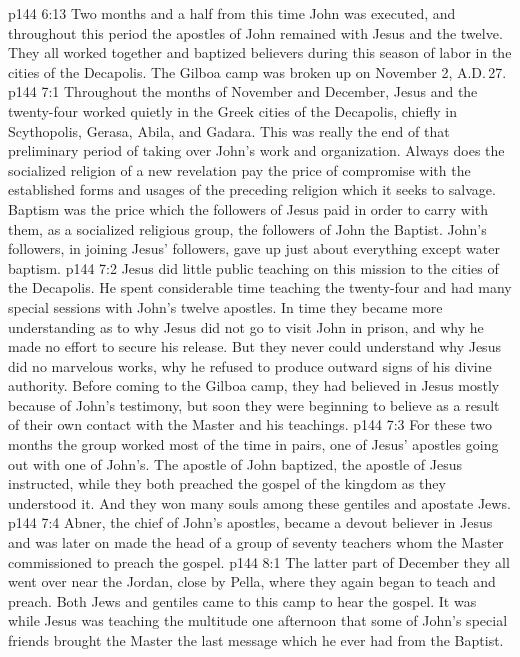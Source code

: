 \vs p144 6:13 \pc Two months and a half from this time John was executed, and throughout this period the apostles of John remained with Jesus and the twelve. They all worked together and baptized believers during this season of labor in the cities of the Decapolis. The Gilboa camp was broken up on November 2, A.D.\,27.
\vs p144 7:1 Throughout the months of November and December, Jesus and the twenty\hyp{}four worked quietly in the Greek cities of the Decapolis, chiefly in Scythopolis, Gerasa, Abila, and Gadara. This was really the end of that preliminary period of taking over John’s work and organization. Always does the socialized religion of a new revelation pay the price of compromise with the established forms and usages of the preceding religion which it seeks to salvage. Baptism was the price which the followers of Jesus paid in order to carry with them, as a socialized religious group, the followers of John the Baptist. John’s followers, in joining Jesus’ followers, gave up just about everything except water baptism.
\vs p144 7:2 Jesus did little public teaching on this mission to the cities of the Decapolis. He spent considerable time teaching the twenty\hyp{}four and had many special sessions with John’s twelve apostles. In time they became more understanding as to why Jesus did not go to visit John in prison, and why he made no effort to secure his release. But they never could understand why Jesus did no marvelous works, why he refused to produce outward signs of his divine authority. Before coming to the Gilboa camp, they had believed in Jesus mostly because of John’s testimony, but soon they were beginning to believe as a result of their own contact with the Master and his teachings.
\vs p144 7:3 For these two months the group worked most of the time in pairs, one of Jesus’ apostles going out with one of John’s. The apostle of John baptized, the apostle of Jesus instructed, while they both preached the gospel of the kingdom as they understood it. And they won many souls among these gentiles and apostate Jews.
\vs p144 7:4 Abner, the chief of John’s apostles, became a devout believer in Jesus and was later on made the head of a group of seventy teachers whom the Master commissioned to preach the gospel.
\vs p144 8:1 The latter part of December they all went over near the Jordan, close by Pella, where they again began to teach and preach. Both Jews and gentiles came to this camp to hear the gospel. It was while Jesus was teaching the multitude one afternoon that some of John’s special friends brought the Master the last message which he ever had from the Baptist.

